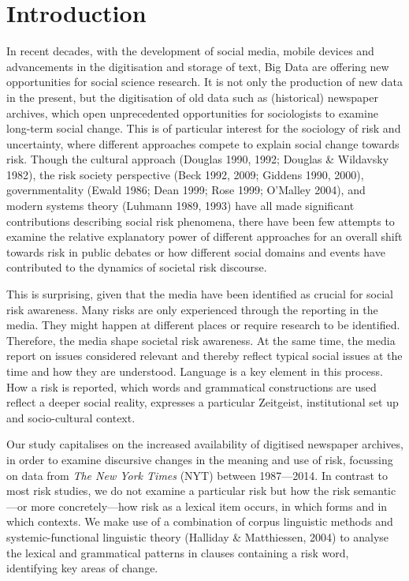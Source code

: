 

\section{Introduction}

In recent decades, with the development of social media, mobile devices and advancements in the digitisation and storage of text, Big Data are offering new opportunities for social science research. It is not only the production of new data in the present, but the digitisation of old data such as (historical) newspaper archives, which open unprecedented opportunities for sociologists to examine long-term social change. This is of particular interest for the sociology of risk and uncertainty, where different approaches compete to explain social change towards risk. Though the cultural approach (Douglas 1990, 1992; Douglas \& Wildavsky 1982), the risk society perspective (Beck 1992, 2009; Giddens 1990, 2000), governmentality (Ewald 1986; Dean 1999; Rose 1999; O'Malley 2004), and modern systems theory (Luhmann 1989, 1993) have all made significant contributions describing social risk phenomena, there have been few attempts to examine the relative explanatory power of different approaches for an overall shift towards risk in public debates or how different social domains and events have contributed to the dynamics of societal risk discourse. 

This is surprising, given that the media have been identified as crucial for social risk awareness. Many risks are only experienced through the reporting in the media. They might happen at different places or require research to be identified. Therefore, the media shape societal risk awareness. At the same time, the media report on issues considered relevant and thereby reflect typical social issues at the time and how they are understood. Language is a key element in this process. How a risk is reported, which words and grammatical constructions are used reflect a deeper social reality, expresses a particular Zeitgeist, institutional set up and socio-cultural context. 

Our study capitalises on the increased availability of digitised newspaper archives, in order to examine discursive changes in the meaning and use of risk, focussing on data from \emph{The New York Times} (NYT) between 1987---2014. In contrast to most risk studies, we do not examine a particular risk but how the risk semantic---or more concretely---how risk as a lexical item occurs, in which forms and in which contexts. We make use of a combination of corpus linguistic methods and systemic-functional linguistic theory (Halliday \& Matthiessen, 2004) to analyse the lexical and grammatical patterns in clauses containing a risk word, identifying key areas of change.

